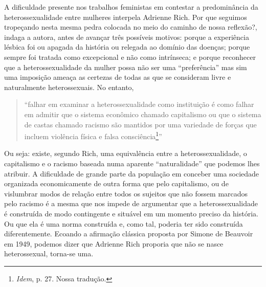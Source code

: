 A dificuldade presente nos trabalhos feministas em contestar a
predominância da heterossexualidade entre mulheres interpela Adrienne
Rich. Por que seguimos tropeçando nesta mesma pedra colocada no meio do
caminho de nossa reflexão?, indaga a autora, antes de avançar três
possíveis motivos: porque a experiência lésbica foi ou apagada da
história ou relegada ao domínio das doenças; porque sempre foi tratada
como excepcional e não como intrínseca; e porque reconhecer que a
heterossexualidade da mulher possa não ser uma ``preferência'' mas sim
uma imposição ameaça as certezas de todas as que se consideram livre e
naturalmente heterossexuais. No entanto,

\begin{quote}
``falhar em examinar a heterossexualidade como instituição é como falhar
em admitir que o sistema econômico chamado capitalismo ou que o sistema
de castas chamado racismo são mantidos por uma variedade de forças que
incluem violência física e falsa consciência\footnote{\emph{Idem}, p.
  27. Nossa tradução.}''
\end{quote}

Ou seja: existe, segundo Rich, uma equivalência entre a
heterossexualidade, o capitalismo e o racismo baseada numa aparente
``naturalidade'' que podemos lhes atribuir. A dificuldade de grande
parte da população em conceber uma sociedade organizada economicamente
de outra forma que pelo capitalismo, ou de vislumbrar modos de relação
entre todos os sujeitos que não fossem marcados pelo racismo é a mesma
que nos impede de argumentar que a heterossexualidade é construída de
modo contingente e situável em um momento preciso da história. Ou que
ela é uma norma construída e, como tal, poderia ter sido construída
diferentemente. Ecoando a afirmação clássica proposta por Simone de
Beauvoir em 1949, podemos dizer que Adrienne Rich proporia que não se
nasce heterossexual, torna-se uma.

